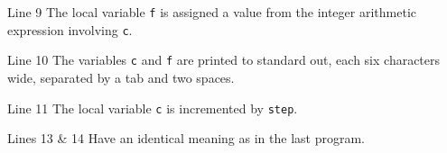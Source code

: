 \documentclass[smaller,table]{beamer} %
\begin{document}
\begin{frame}
\begin{block}{Line 9}
The local variable {\tt f} is assigned a value from the integer arithmetic expression involving {\tt c}.
\end{block}

\begin{block}{Line 10}
The variables {\tt c} and {\tt f} are printed to standard out, each six characters
wide, separated by a tab and two spaces.
\end{block}

\begin{block}{Line 11}
The local variable {\tt c} is incremented by {\tt step}.
\end{block}

\begin{block}{Lines 13 \& 14}
Have an identical meaning as in the last program.
\end{block}

\end{frame}
\end{document}
